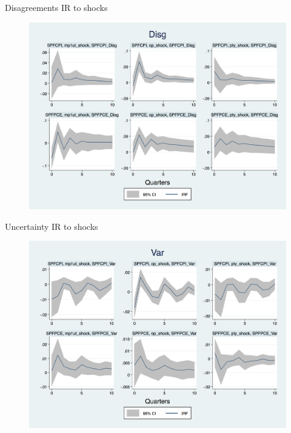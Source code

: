 \documentclass{beamer}
\begin{document}
\begin{frame}{Disagreements IR to  shocks}

\begin{figure}
	\includegraphics[scale=0.3]{figures/SPFDisg_ashocks.png} 
\end{figure}

\end{frame}


\begin{frame}{Uncertainty IR to shocks}

\begin{figure}
	\includegraphics[scale=0.3]{figures/SPFVar_ashocks.png} 
\end{figure}

\end{frame}
\end{document}
